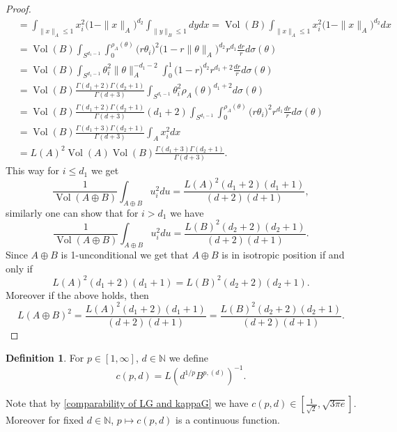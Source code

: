 \documentclass[a4paper,oneside, reqno]{amsart}
\numberwithin{equation}{section}
\theoremstyle{definition}%
\theoremstyle{definition}
\newtheorem{Defn}[Thm]{Definition}
\theoremstyle{definition}%
\theoremstyle{definition}
\newcommand{\N}{\mathbb{N}}
\DeclareMathOperator{\Vol}{Vol}
\begin{document}
\begin{proof}
\begin{align*}
         & =\int_{\|x \|_A\le 1} x_i^2\Big(1- \| x \|_A\Big)^{d_2}  \int_{\|y\|_B \le 1} dy dx = \Vol(B) \int_{\|x \|_A \le 1} x_i^2\Big(1- \|x \|_A \Big)^{d_2} dx \\
         &= \Vol(B) \int_{S^{d_1-1}} \int_{0}^{\rho_A(\theta)} \big(r \theta_i\big)^2 \Big(1- r \| \theta \|_A \Big)^{d_2} r^{d_1} \frac{dr}{r} d \sigma(\theta) \\
         &=\Vol(B) \int_{S^{d_1-1}} \theta_i^2\| \theta \|_A^{-d_1-2} \int_0^1 \big(1-r\big)^{d_2} r^{d_1+2} \frac{dr}{r} d \sigma(\theta) \\
         &=\Vol(B) \frac{\Gamma(d_1+2)\Gamma(d_2+1)}{\Gamma(d+3)} \int_{S^{d_1-1}} \theta_i^2 \rho_A(\theta)^{d_1+2} d \sigma(\theta) \\
         &=\Vol(B) \frac{\Gamma(d_1+2)\Gamma(d_2+1)}{\Gamma(d+3)} (d_1+2) \int_{S^{d_1-1}} \int_0^{\rho_A(\theta)} \big(r \theta_i\big)^2 r^{d_1} \frac{dr}{r} d \sigma(\theta) \\
         &=\Vol(B) \frac{\Gamma(d_1+3)\Gamma(d_2+1)}{\Gamma(d+3)} \int_{A} x_i^2 dx \\
         &=L(A)^2\Vol(A)\Vol(B) \frac{\Gamma(d_1+3)\Gamma(d_2+1)}{\Gamma(d+3)}.
        \end{align*}
        This way for $i \le d_1$ we get 
        \begin{equation} \label{eq:L(A)}
            \frac{1}{\Vol(A\oplus B )} \int_{A \oplus B} u_i^2 du= \frac{L(A)^2 (d_1+2)(d_1+1)}{(d+2)(d+1)},
        \end{equation}
        similarly one can show that for $i>d_1$ we have 
        \begin{equation} \label{eq:L(B)}
            \frac{1}{\Vol(A\oplus B )} \int_{A \oplus B} u_i^2 du= \frac{L(B)^2 (d_2+2)(d_2+1)}{(d+2)(d+1)}.
        \end{equation}
        Since $A \oplus B$ is 1-unconditional we get that $A \oplus B$ is in isotropic position if and only if 
        \[
        L(A)^2 (d_1+2)(d_1+1)=L(B)^2 (d_2+2)(d_2+1).
        \]
        Moreover if the above holds, then
        \[
        L(A \oplus B)^2=\frac{L(A)^2 (d_1+2)(d_1+1)}{(d+2)(d+1)} =\frac{L(B)^2 (d_2+2)(d_2+1)}{(d+2)(d+1)}.
        \]
\end{proof}
\begin{Defn}
    For $p \in [1,\infty]$, $d \in \N$ we define 
    \[
    c(p,d)=L(d^{1/p}B^{p,(d)})^{-1}.
    \]
\end{Defn}
Note that by \eqref{comparability of LG and kappaG}
we have $c(p,d) \in [ \frac{1}{\sqrt{2}}, \sqrt{3 \pi e}]$. Moreover for fixed $d \in \N$, $ p \mapsto c(p,d)$ is a continuous function.
\end{document}
